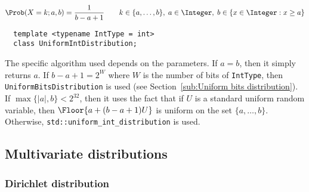 \begin{equation*}
  \Prob(X = k;a,b) = \frac{1}{b - a + 1} \qquad
  k \in \{a,\dots,b\},\; a \in \Integer,\; b \in \{x \in \Integer: x \ge a\}
\end{equation*}
\begin{Verbatim}
  template <typename IntType = int>
  class UniformIntDistribution;
\end{Verbatim}
The specific algorithm used depends on the parameters. If $a = b$, then it
simply returns $a$. If $b - a + 1 = 2^W$ where $W$ is the number of bits of
\verb|IntType|, then \verb|UniformBitsDistribution| is used (see
Section~\ref{sub:Uniform bits distribution}). If $\max\{|a|, b\} < 2^{32}$,
then it uses the fact that if $U$ is a standard uniform random variable, then
$\Floor{a + (b - a + 1) U}$ is uniform on the set $\{a,\dots,b\}$. Otherwise,
\verb|std::uniform_int_distribution| is used.

\subsection{Multivariate distributions}
\label{sub:Multivariate distributions}

\subsubsection{Dirichlet distribution}

